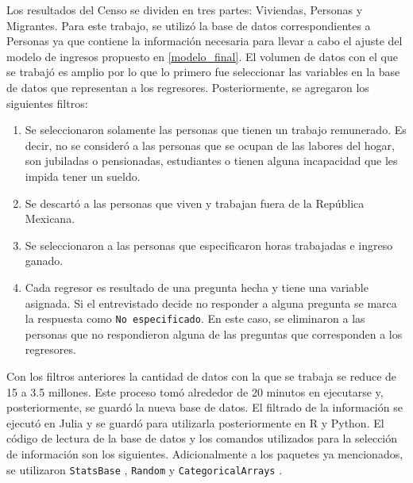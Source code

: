 Los resultados del Censo se dividen en tres partes: Viviendas, Personas y Migrantes. Para este trabajo, se utilizó la base de datos correspondientes a Personas ya que contiene la información necesaria para llevar a cabo el ajuste del modelo de ingresos propuesto en \ref{modelo_final}. El volumen de datos con el que se trabajó es amplio por lo que lo primero fue seleccionar las variables en la base de datos que representan a los regresores. Posteriormente, se agregaron los siguientes filtros:

\begin{enumerate}
    \item Se seleccionaron solamente las personas que tienen un trabajo remunerado. Es decir, no se consideró a las personas que
    se ocupan de las labores del hogar, son jubiladas o pensionadas, estudiantes o tienen alguna incapacidad que les impida tener un sueldo. 
    
    \item Se descartó a las personas que viven y trabajan fuera de la República Mexicana. 
    
    \item Se seleccionaron a las personas que especificaron horas trabajadas e ingreso ganado.
    
    \item Cada regresor es resultado de una pregunta hecha y tiene una variable asignada. Si el entrevistado decide no responder a alguna pregunta se marca la respuesta como \texttt{No especificado}. En este caso, se eliminaron a las personas que no respondieron alguna de las preguntas que corresponden a los regresores. 
\end{enumerate}

Con los filtros anteriores la cantidad de datos con la que se trabaja se reduce de 15 a 3.5 millones. Este proceso tomó alrededor de 20 minutos en ejecutarse y, posteriormente, se guardó la nueva base de datos. El filtrado de la información se ejecutó en \textsf{Julia} y se guardó para utilizarla posteriormente en \textsf{R} y \textsf{Python}. El código de lectura de la base de datos y los comandos utilizados para la selección de información son los siguientes. Adicionalmente a los paquetes ya mencionados, se utilizaron \texttt{StatsBase} \citep{software_statsbase}, \texttt{Random} \citep{Julia-2017} y \texttt{CategoricalArrays} \citep{software_catArrays}. 


